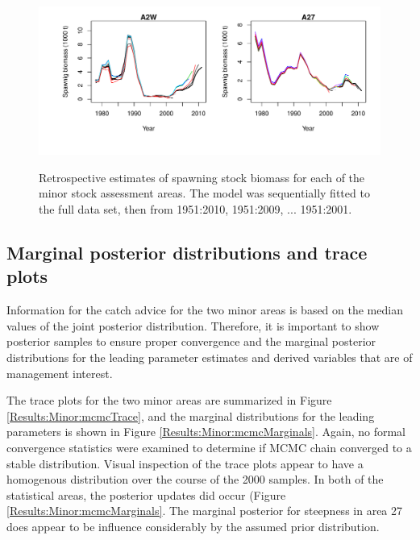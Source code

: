 \begin{figure}[!tbp]
	\includegraphics[width=\textwidth]{../FIGS/MinorAreas/iscam_fig_sbt_retrospective.pdf}\\
	\caption{Retrospective estimates of spawning stock biomass for each of the minor stock assessment areas.  The model was sequentially fitted to the full data set, then from 1951:2010, 1951:2009, ... 1951:2001.}\label{fig:Results:Minor:retrospective}
\end{figure}

\subsection{Marginal posterior distributions and trace plots}

Information for the catch advice for the two minor areas is based on the median values of the joint posterior distribution.  Therefore, it is important to show posterior samples to ensure proper convergence and the marginal posterior distributions for the leading parameter estimates and derived variables  that are of management interest.

 The trace plots for the two minor areas are summarized in Figure \ref{Results:Minor:mcmcTrace}, and the marginal distributions for the leading parameters is shown in Figure \ref{Results:Minor:mcmcMarginals}.  Again, no formal convergence statistics were examined to determine if MCMC chain converged to a stable distribution.  Visual inspection of the trace plots appear to have a homogenous distribution over the course of the 2000 samples.  In both of the statistical areas, the posterior updates did occur (Figure \ref{Results:Minor:mcmcMarginals}.  The marginal posterior for steepness in area 27 does appear to be influence considerably by the assumed prior distribution.
 
